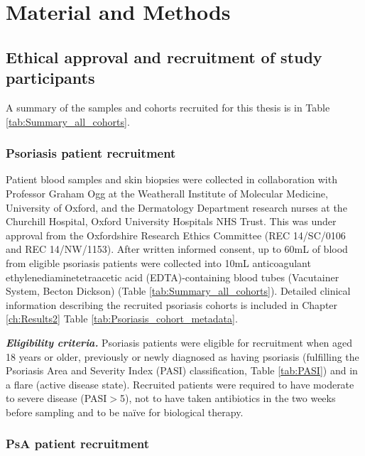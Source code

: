 \chapter{Material and Methods}
\label{ch:Mat}



\section{Ethical approval and recruitment of study participants}
A summary of the samples and cohorts recruited for this thesis is in Table \ref{tab:Summary_all_cohorts}.

\subsection{Psoriasis patient recruitment}

Patient blood samples and skin biopsies were collected in collaboration with Professor Graham Ogg at the Weatherall Institute of Molecular Medicine, University of Oxford, and the Dermatology Department research nurses at the Churchill Hospital, Oxford University Hospitals NHS Trust. This was under approval from the Oxfordshire Research Ethics Committee (REC 14/SC/0106 and REC 14/NW/1153). After written informed consent, up to 60mL of blood from eligible psoriasis patients were collected into 10mL anticoagulant ethylenediaminetetraacetic acid (EDTA)-containing blood tubes (Vacutainer System, Becton Dickson) (Table \ref{tab:Summary_all_cohorts}). Detailed clinical information describing the recruited psoriasis cohorts is included in Chapter \ref{ch:Results2} Table \ref{tab:Psoriasis_cohort_metadata}.

\textit{\textbf{Eligibility criteria.}} Psoriasis patients were eligible for recruitment when aged 18 years or older, previously or newly diagnosed as having psoriasis (fulfilling the Psoriasis Area and Severity Index (PASI) classification, Table \ref{tab:PASI}) and in a flare (active disease state). Recruited patients were required to have moderate to severe disease (PASI$>$5), not to have taken antibiotics in the two weeks before sampling and to be na\"{i}ve for biological therapy. 



\subsection{PsA patient recruitment}

